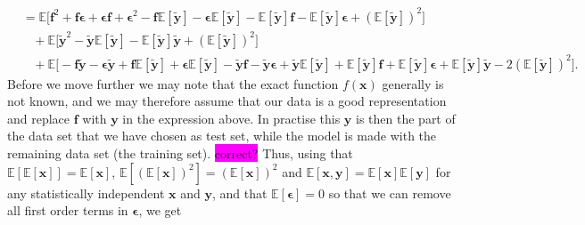 \documentclass[aps,pra,english,notitlepage,reprint,nofootinbib]{revtex4-1}  %
\begin{document}
\begin{align*}
\\
&= \mathbb{E}\Big[\mathbf{f}^2 + \mathbf{f}\boldsymbol{\epsilon} + \boldsymbol{\epsilon}\mathbf{f} + \boldsymbol{\epsilon}^2 - \mathbf{f}\mathbb{E}\left[\mathbf{\tilde{y}}\right] -\boldsymbol{\epsilon}\mathbb{E}\left[\mathbf{\tilde{y}}\right] -\mathbb{E}\left[\mathbf{\tilde{y}}\right]\mathbf{f} -\mathbb{E}\left[\mathbf{\tilde{y}}\right]\boldsymbol{\epsilon}  + \left(\mathbb{E}\left[\mathbf{\tilde{y}}\right]\right)^2\Big]
\\
&\hspace{10pt} + \mathbb{E}\Big[\mathbf{\tilde{y}}^2 - \mathbf{\tilde{y}}\mathbb{E}\left[\mathbf{\tilde{y}}\right] - \mathbb{E}\left[\mathbf{\tilde{y}}\right]\mathbf{\tilde{y}} + \left(\mathbb{E}\left[\mathbf{\tilde{y}}\right]\right)^2\Big]
\\
&\hspace{10pt} +\mathbb{E}\Big[-\mathbf{f}\mathbf{\tilde{y}}- \boldsymbol{\epsilon}\mathbf{\tilde{y}} + \mathbf{f}\mathbb{E}\left[\mathbf{\tilde{y}} \right]+ \boldsymbol{\epsilon}\mathbb{E}\left[\mathbf{\tilde{y}} \right]  - \mathbf{\tilde{y}}\mathbf{f}- \mathbf{\tilde{y}}\boldsymbol{\epsilon} + \mathbf{\tilde{y}}\mathbb{E}\left[\mathbf{\tilde{y}}\right] + \mathbb{E}\left[\mathbf{\tilde{y}}\right]\mathbf{f}+ \mathbb{E}\left[\mathbf{\tilde{y}}\right]\boldsymbol{\epsilon} + \mathbb{E}\left[\mathbf{\tilde{y}}\right]\mathbf{\tilde{y}} - 2\left(\mathbb{E}\left[\mathbf{\tilde{y}}\right]\right)^2\Big].
\end{align*}
Before we move further we may note that the exact function $f(\mathbf{x})$ generally is not known, and we may therefore assume that our data is a good representation and replace $\mathbf{f}$ with $\mathbf{y}$ in the expression above. In practise this $\mathbf{y}$ is then the part of the data set that we have chosen as test set, while the model is made with the remaining data set (the training set). \colorbox{magenta}{correct?} Thus, using that $\mathbb{E}[\mathbb{E}[\mathbf{x}]]= \mathbb{E}[\mathbf{x}]$, $\mathbb{E}[(\mathbb{E}[\mathbf{x}])^2] = (\mathbb{E}[\mathbf{x}])^2$ and $\mathbb{E}[\mathbf{x},\mathbf{y}]=\mathbb{E}[\mathbf{x}]\mathbb{E}[\mathbf{y}]$ for any statistically independent $\mathbf{x}$ and $\mathbf{y}$, and that $\mathbb{E}[\boldsymbol{\epsilon}]=0$ so that we can remove all first order terms in $\boldsymbol{\epsilon}$, we get
\end{document}
